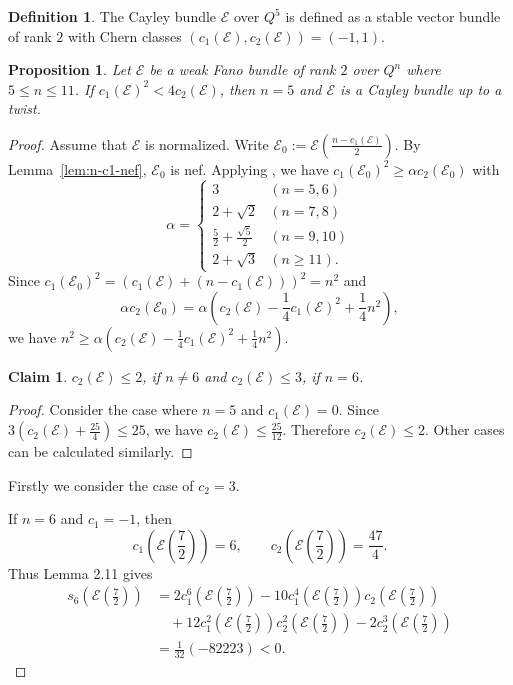 \documentclass{amsproc}
\newtheorem{proposition}[theorem]{Proposition}
\newtheorem{claim}[theorem]{Claim}
\theoremstyle{definition}
\newtheorem{definition}[theorem]{Definition}
\def\cE{{\mathcal E}}
\begin{document}
\begin{definition}\label{def:cayley}
The Cayley bundle $\cE$ over $Q^5$ is defined as a stable vector bundle of rank $2$ with Chern classes $(c_1(\cE), c_2(\cE))=(-1,1)$.
\end{definition}

\begin{proposition}\label{prop:5-11}
Let $\cE$ be a weak Fano bundle of rank $2$ over $Q^n$ where $5\le n\le11$. If $c_1(\cE)^2< 4c_2(\cE)$, then $n=5$ and $\cE$ is a Cayley bundle up to a twist. 
\end{proposition}

\begin{proof}
Assume that $\cE$ is normalized. Write $\cE_0:=\cE\left(\frac{n-c_1(\cE)}{2}\right)$. By Lemma~\ref{lem:n-c1-nef}, $\cE_0$ is nef. Applying \cite[Proposition~1.4]{APW94}, we have $c_1(\cE_0)^2\ge\alpha c_2(\cE_0)$ with 
$$
\alpha=
\begin{cases}
3&(n=5,6)\\
2+\sqrt{2}&(n=7,8)\\
\frac{5}{2}+\frac{\sqrt{5}}{2}&(n=9,10)\\
2+\sqrt{3}&(n\ge 11).
\end{cases}
$$
Since  $c_1(\cE_0)^2=(c_1(\cE)+(n-c_1(\cE)))^2=n^2$ and
$$
\alpha c_2(\cE_0)=\alpha\left(c_2\left(\cE\right)-\frac{1}{4}c_1(\cE)^2+\frac{1}{4}n^2\right), 
$$
we have $n^2\ge\alpha\left(c_2\left(\cE\right)-\frac{1}{4}c_1(\cE)^2+\frac{1}{4}n^2\right)$.

\begin{claim}
$c_2(\cE)\le 2$, if $n\neq6$ and $c_2(\cE)\le 3$, if $n=6$.
\end{claim}

\begin{proof}
Consider the case where $n=5$ and $c_1(\cE)=0$. Since $3\left(c_2\left(\cE\right)+\displaystyle\frac{25}{4}\right)\le 25$, we have $c_2(\cE)\le \displaystyle\frac{25}{12}$. Therefore $c_2(\cE)\le 2$. Other cases can be calculated similarly.
\end{proof}

Firstly we consider the case of $c_2=3$. 
 
If \(n=6\) and \(c_1=-1\), then
\[
c_1\left(\mathcal{E}\left(\frac{7}{2}\right)\right)=6,
\qquad
c_2\left(\mathcal{E}\left(\frac{7}{2}\right)\right)=\frac{47}{4}.
\]
Thus Lemma 2.11 gives
\[
\begin{aligned}
s_6\left(\mathcal{E}\left(\frac{7}{2}\right)\right)
&=
2c_1^6\left(\mathcal{E}\left(\frac{7}{2}\right)\right)
-10c_1^4\left(\mathcal{E}\left(\frac{7}{2}\right)\right)
c_2\left(\mathcal{E}\left(\frac{7}{2}\right)\right) \\
&\quad
+12c_1^2\left(\mathcal{E}\left(\frac{7}{2}\right)\right)
c_2^2\left(\mathcal{E}\left(\frac{7}{2}\right)\right)
-2c_2^3\left(\mathcal{E}\left(\frac{7}{2}\right)\right) \\
&=
\frac{1}{32}(-82223)
<0.
\end{aligned}
\]


\end{proof}
\end{document}
